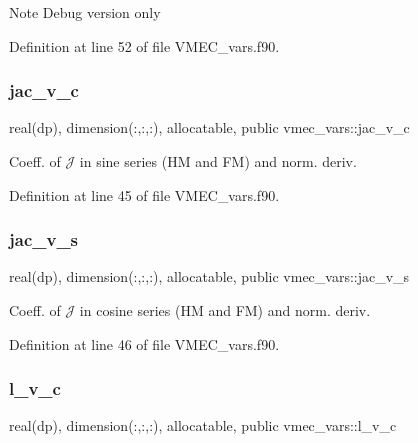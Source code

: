 \begin{DoxyNote}{Note}
Debug version only 
\end{DoxyNote}


Definition at line 52 of file V\+M\+E\+C\+\_\+vars.\+f90.

\mbox{\label{namespacevmec__vars_a1cc9293ec589081fb212b88f4e5592f0}} 
\subsubsection{\texorpdfstring{jac\+\_\+v\+\_\+c}{jac\_v\_c}}
{\footnotesize\ttfamily real(dp), dimension(\+:,\+:,\+:), allocatable, public vmec\+\_\+vars\+::jac\+\_\+v\+\_\+c}



Coeff. of $\mathcal{J}$ in sine series (HM and FM) and norm. deriv. 



Definition at line 45 of file V\+M\+E\+C\+\_\+vars.\+f90.

\mbox{\label{namespacevmec__vars_a82168b3717cf13d2d8a50f5cfc19fded}} 
\subsubsection{\texorpdfstring{jac\+\_\+v\+\_\+s}{jac\_v\_s}}
{\footnotesize\ttfamily real(dp), dimension(\+:,\+:,\+:), allocatable, public vmec\+\_\+vars\+::jac\+\_\+v\+\_\+s}



Coeff. of $\mathcal{J}$ in cosine series (HM and FM) and norm. deriv. 



Definition at line 46 of file V\+M\+E\+C\+\_\+vars.\+f90.

\mbox{\label{namespacevmec__vars_acf90dcedfaae39a8a6778fbf75a90a40}} 
\subsubsection{\texorpdfstring{l\+\_\+v\+\_\+c}{l\_v\_c}}
{\footnotesize\ttfamily real(dp), dimension(\+:,\+:,\+:), allocatable, public vmec\+\_\+vars\+::l\+\_\+v\+\_\+c}



